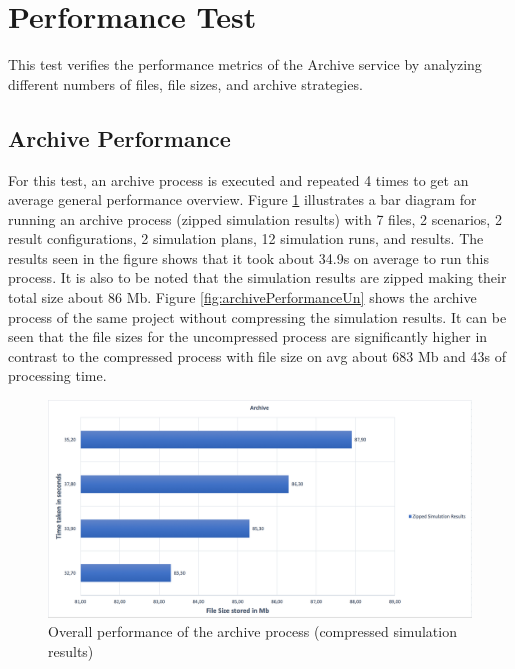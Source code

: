 \section{Performance Test}
This test verifies the performance metrics of the Archive service by analyzing different numbers of files, file sizes, and archive strategies.

\subsection{Archive Performance}
For this test, an archive process is executed and repeated 4 times to get an average general performance overview. Figure \ref{fig:archivePerformance} illustrates a bar diagram for running an archive process (zipped simulation results) with 7 files, 2 scenarios, 2 result configurations, 2 simulation plans,
12 simulation runs, and results. The results seen in the figure shows that it took about 34.9s on average to run this process. It is also to be noted that the
simulation results are zipped making their total size about 86 Mb. Figure \ref{fig:archivePerformanceUn} shows the archive process of the same project without 
compressing the simulation results. It can be seen that the file sizes for the uncompressed process are significantly higher in contrast to the compressed
process with file size on avg about 683 Mb and 43s of processing time.

\begin{figure}[H]
    \centering \includegraphics[scale=0.45]{grafiken/archiveZip.png}
    \caption{Overall performance of the archive process (compressed simulation results)}
    \label{fig:archivePerformance}
\end{figure}

